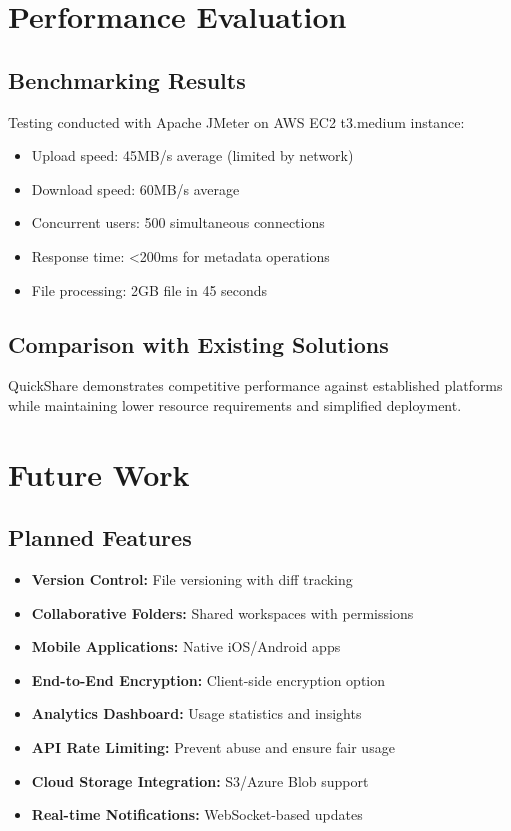 \documentclass[final]{cvpr}
\begin{document}
\section{Performance Evaluation}

\subsection{Benchmarking Results}
Testing conducted with Apache JMeter on AWS EC2 t3.medium instance:
\begin{itemize}
    \item Upload speed: 45MB/s average (limited by network)
    \item Download speed: 60MB/s average  
    \item Concurrent users: 500 simultaneous connections
    \item Response time: <200ms for metadata operations
    \item File processing: 2GB file in 45 seconds
\end{itemize}

\subsection{Comparison with Existing Solutions}
QuickShare demonstrates competitive performance against established platforms while maintaining lower resource requirements and simplified deployment.

\section{Future Work}

\subsection{Planned Features}
\begin{itemize}
    \item \textbf{Version Control:} File versioning with diff tracking
    \item \textbf{Collaborative Folders:} Shared workspaces with permissions
    \item \textbf{Mobile Applications:} Native iOS/Android apps
    \item \textbf{End-to-End Encryption:} Client-side encryption option
    \item \textbf{Analytics Dashboard:} Usage statistics and insights
    \item \textbf{API Rate Limiting:} Prevent abuse and ensure fair usage
    \item \textbf{Cloud Storage Integration:} S3/Azure Blob support
    \item \textbf{Real-time Notifications:} WebSocket-based updates
\end{itemize}
\end{document}

